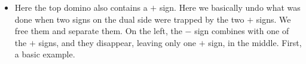 \documentclass[12pt]{article}
\numberwithin{equation}{section}
\begin{document}
\begin{itemize}
\begin{itemize}
\begin{itemize}
\begin{itemize}
\begin{figure}[H]
          \end{figure}
          \item Here the top domino also contains a $+$ sign.
          Here we basically undo what was done when two signs on the dual side were trapped by the two $+$ signs.
          We free them and separate them.
          On the left, the $-$ sign combines with one of the $+$ signs, and they disappear, leaving only one $+$ sign, in the middle.
          First, a basic example.
          \begin{figure}[H]
            \centering
          \end{figure}
          \begin{figure}[H]
            \centering

\end{figure}
\end{itemize}
\end{itemize}
\end{itemize}
\end{itemize}
\end{document}
